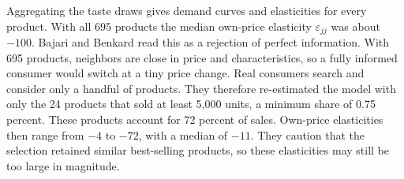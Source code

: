 Aggregating the taste draws gives demand curves and elasticities for every product. With all 695 products the median
own-price elasticity $\varepsilon_{jj}$ was about $-100$. Bajari and Benkard read this as a rejection of perfect information. With 695 products,
neighbors are close in price and characteristics, so a fully informed consumer would switch at a tiny price change. Real
consumers search and consider only a handful of products. They therefore re-estimated the model with only the 24 products that
sold at least 5,000 units, a minimum share of 0.75 percent. These products account for 72 percent of sales. Own-price
elasticities then range from $-4$ to $-72$, with a median of $-11$. They caution that the selection retained similar
best-selling products, so these elasticities may still be too large in magnitude.

